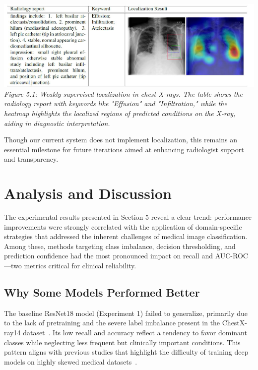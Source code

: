 \documentclass[12pt]{article}
\begin{document}
\begin{multicols}{2}
\begin{center}
    \includegraphics[width=\linewidth]{figure5.1.png}
    \\[1em]
    \textit{Figure 5.1: Weakly-supervised localization in chest X-rays. The table shows the radiology report with keywords like "Effusion" and "Infiltration," while the heatmap highlights the localized regions of predicted conditions on the X-ray, aiding in diagnostic interpretation.}
\end{center}

Though our current system does not implement localization, this remains an essential milestone for future iterations aimed at enhancing radiologist support and transparency.

\section{Analysis and Discussion}

The experimental results presented in Section 5 reveal a clear trend: performance improvements were strongly correlated with the application of domain-specific strategies that addressed the inherent challenges of medical image classification. Among these, methods targeting class imbalance, decision thresholding, and prediction confidence had the most pronounced impact on recall and AUC-ROC—two metrics critical for clinical reliability.

\subsection{Why Some Models Performed Better}
The baseline ResNet18 model (Experiment 1) failed to generalize, primarily due to the lack of pretraining and the severe label imbalance present in the ChestX-ray14 dataset~\cite{wang2017chestx}. Its low recall and accuracy reflect a tendency to favor dominant classes while neglecting less frequent but clinically important conditions. This pattern aligns with previous studies that highlight the difficulty of training deep models on highly skewed medical datasets~\cite{irvin2019chexpert}.


\end{multicols}
\end{document}
